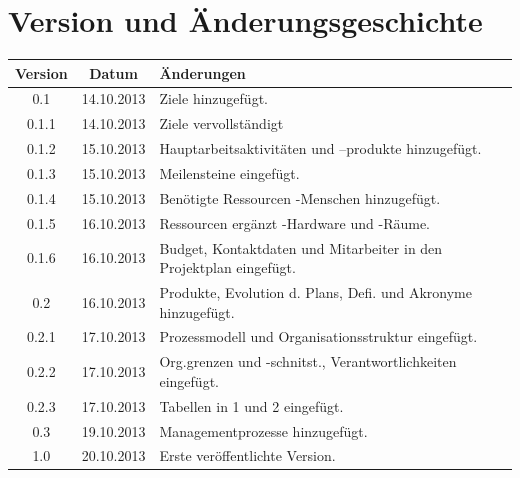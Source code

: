 \documentclass[fontsize=12pt,paper=a4,twoside]{scrartcl}
\begin{document}
\newpage

  \thispagestyle{fancy}
  \fancyhead{}
  \fancyfoot{}
  \renewcommand{\headrulewidth}{0.4pt}
  \tableofcontents

\newpage



\section*{Version und Änderungsgeschichte}



\begin{tabular}{ccl}
Version & Datum & Änderungen \\
\hline
0.1 & 14.10.2013 & Ziele hinzugefügt.\\
0.1.1 & 14.10.2013 & Ziele vervollständigt\\
0.1.2 & 15.10.2013 & Hauptarbeitsaktivitäten und --produkte hinzugefügt.\\
0.1.3 & 15.10.2013 & Meilensteine eingefügt.\\
0.1.4 & 15.10.2013 & Benötigte Ressourcen -Menschen hinzugefügt.\\
0.1.5 & 16.10.2013 & Ressourcen ergänzt -Hardware und -Räume.\\
0.1.6 & 16.10.2013 & Budget, Kontaktdaten und Mitarbeiter in den Projektplan eingefügt.\\
0.2 & 16.10.2013 &  Produkte, Evolution d. Plans, Defi. und Akronyme hinzugefügt.\\
0.2.1 & 17.10.2013 & Prozessmodell und Organisationsstruktur eingefügt.\\
0.2.2 & 17.10.2013 & Org.grenzen und -schnitst., Verantwortlichkeiten eingefügt.\\
0.2.3 & 17.10.2013 & Tabellen in 1 und 2 eingefügt.\\
0.3 & 19.10.2013 & Managementprozesse hinzugefügt.\\
1.0 & 20.10.2013 & Erste veröffentlichte Version. \\
\end{tabular}
\end{document}
